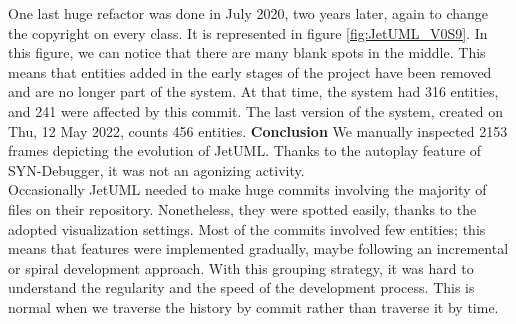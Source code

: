 \bigbreak
One last huge refactor was done in July 2020, two years later, again to change the copyright on every class. It is represented in figure \ref{fig:JetUML_V0S9}. In this figure, we can notice that there are many blank spots in the middle. This means that entities added in the early stages of the project have been removed and are no longer part of the system. At that time, the system had 316 entities, and 241 were affected by this commit. 
\bigbreak
The last version of the system, created on Thu, 12 May 2022, counts 456 entities. 
\bigbreak
\textbf{Conclusion}
We manually inspected 2153 frames depicting the evolution of JetUML.
Thanks to the autoplay feature of SYN-Debugger, it was not an agonizing activity. \\
Occasionally JetUML needed to make huge commits involving the majority of files on their repository. Nonetheless, they were spotted easily, thanks to the adopted visualization settings. 
Most of the commits involved few entities; this means that features were implemented gradually, maybe following an incremental or spiral development approach. 
With this grouping strategy, it was hard to understand the regularity and the speed of the development process. This is normal when we traverse the history by commit rather than traverse it by time. 

